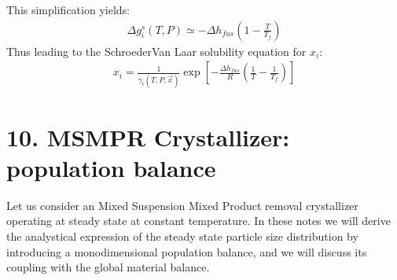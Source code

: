 \documentclass[letterpaper,10pt,english]{jupyterBook}
\begin{document}
\sphinxAtStartPar
This simplification yields:
\begin{equation*}
\begin{split}
\Delta{g}_i^s(T,P)\simeq-\Delta{h_{fus}\left(1-\frac{T}{T_f}\right)}
\end{split}
\end{equation*}
\sphinxAtStartPar
Thus leading to the Schroeder\sphinxhyphen{}Van Laar solubility equation for \(x_i\):
\begin{equation*}
\begin{split}
x_i=\frac{1}{\gamma_i(T,P,\vec{x})}\exp\left[{-\frac{\Delta{h_{fus}}}{R}\left(\frac{1}{T}-\frac{1}{T_f}\right)}\right]
\end{split}
\end{equation*}
\sphinxstepscope


\section{10. MSMPR Crystallizer: population balance}
\label{\detokenize{MSMPR_crystallizer:msmpr-crystallizer-population-balance}}\label{\detokenize{MSMPR_crystallizer::doc}}
\sphinxAtStartPar
Let us consider an Mixed Suspension Mixed Product removal crystallizer operating at steady state at constant temperature.
In these notes we will derive the analystical expression of the steady state particle size distribution by introducing a monodimensional population balance, and we will discuss its coupling with the global material balance.
\end{document}
